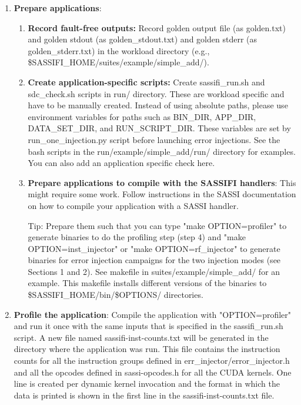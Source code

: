 \begin{enumerate}
\item {\bf Prepare applications}:
		\begin{enumerate}

			\item {\bf Record fault-free outputs:} Record golden output file (as
			golden.txt) and golden stdout (as golden\_stdout.txt) and golden stderr
			(as golden\_stderr.txt) in the workload directory (e.g.,
			\$SASSIFI\_HOME/suites/example/simple\_add/).
			\label{step41}

			\item {\bf Create application-specific scripts:} Create sassifi\_run.sh
			and sdc\_check.sh scripts in run/ directory.  These are workload specific
			and have to be manually created. Instead of using absolute paths, please
			use environment variables for paths such as BIN\_DIR, APP\_DIR,
			DATA\_SET\_DIR, and RUN\_SCRIPT\_DIR. These variables are set by
			run\_one\_injection.py script before launching error injections. See
			the bash scripts in the run/example/simple\_add/run/ directory for
			examples. You can also add an application specific check here. 
			\label{step42}

			\item {\bf Prepare applications to compile with the SASSIFI handlers}:
			This might require some work. Follow instructions in the SASSI
			documentation on how to compile your application with a SASSI handler.
			
			Tip: Prepare them such that you can type "make OPTION=profiler" to
			generate binaries to do the profiling step (step 4) and "make
			OPTION=inst\_injector"  or "make OPTION=rf\_injector" to generate
			binaries for error injection campaigns for the two injection modes (see
			Sections 1 and 2). See makefile in suites/example/simple\_add/ for an
			example. This makefile installs different versions of the binaries to 
			\$SASSIFI\_HOME/bin/\$OPTIONS/ directories. 
			\label{step43}

			\end{enumerate}

\item {\bf Profile the application}:
		Compile the application with "OPTION=profiler" and run it once with the
		same inputs that is specified in the sassifi\_run.sh script. A new file
		named sassifi-inst-counts.txt will be generated in the directory where the
		application was run. This file contains the instruction counts for all the
		instruction groups defined in err\_injector/error\_injector.h and all the
		opcodes defined in sassi-opcodes.h for all the CUDA kernels. One line is
		created per dynamic kernel invocation and the format in which the data is
		printed is shown in the first line in the sassifi-inst-counts.txt file. 
\label{step5}


\end{enumerate}
